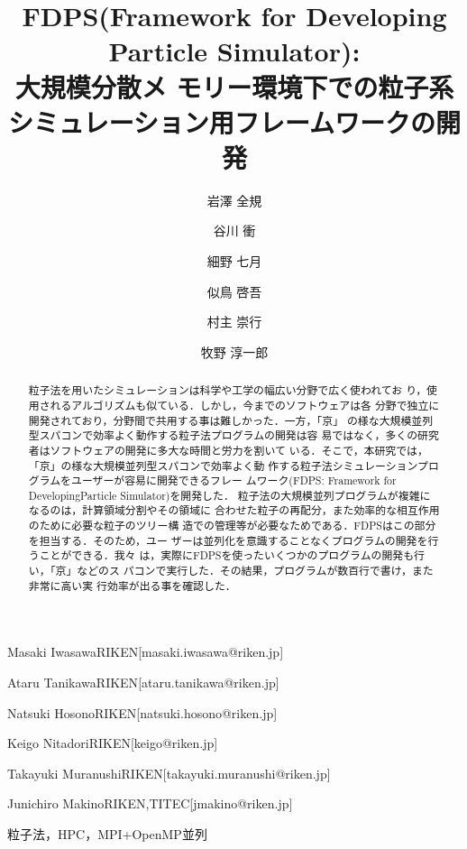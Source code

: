 \documentclass[submit,techreq,noauthor]{ipsj}
\begin{document}
\title{FDPS(Framework for Developing Particle Simulator): \\ 大規模分散メ
  モリー環境下での粒子系シミュレーション用フレームワークの開発}




\author{岩澤 全規}{Masaki Iwasawa}{RIKEN}[masaki.iwasawa@riken.jp]
\author{谷川 衝}{Ataru Tanikawa}{RIKEN}[ataru.tanikawa@riken.jp]
\author{細野 七月}{Natsuki Hosono}{RIKEN}[natsuki.hosono@riken.jp]
\author{似鳥 啓吾}{Keigo Nitadori}{RIKEN}[keigo@riken.jp]
\author{村主 崇行}{Takayuki Muranushi}{RIKEN}[takayuki.muranushi@riken.jp]
\author{牧野 淳一郎}{Junichiro Makino}{RIKEN,TITEC}[jmakino@riken.jp]

\begin{abstract}
  
粒子法を用いたシミュレーションは科学や工学の幅広い分野で広く使われてお
り，使用されるアルゴリズムも似ている．しかし，今までのソフトウェアは各
分野で独立に開発されており，分野間で共用する事は難しかった．一方，「京」
の様な大規模並列型スパコンで効率よく動作する粒子法プログラムの開発は容
易ではなく，多くの研究者はソフトウェアの開発に多大な時間と労力を割いて
いる．そこで，本研究では，「京」の様な大規模並列型スパコンで効率よく動
作する粒子法シミュレーションプログラムをユーザーが容易に開発できるフレー
ムワーク(FDPS: Framework for DevelopingParticle Simulator)を開発した．
粒子法の大規模並列プログラムが複雑になるのは，計算領域分割やその領域に
合わせた粒子の再配分，また効率的な相互作用のために必要な粒子のツリー構
造での管理等が必要なためである．FDPSはこの部分を担当する．そのため，ユー
ザーは並列化を意識することなくプログラムの開発を行うことができる．我々
は，実際にFDPSを使ったいくつかのプログラムの開発も行い，「京」などのス
パコンで実行した．その結果，プログラムが数百行で書け，また非常に高い実
行効率が出る事を確認した．
  
\end{abstract}

\begin{jkeyword}
粒子法，HPC，MPI+OpenMP並列
\end{jkeyword}

\end{document}
